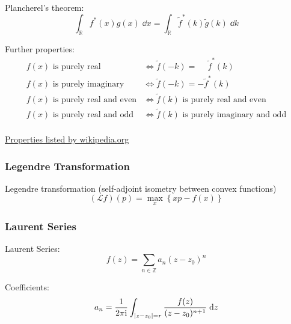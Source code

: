 			\noindent
			Plancherel's theorem:
			\begin{equation}
				\int_{\mathbb{R}} f^{*}(x) g(x)\;\dd x =
				\int_{\mathbb{R}}\tilde{f}^{*}(k)\tilde{g}(k)\;\dd k
			\end{equation}

			\noindent
			Further properties:
			\begin{equation}
				\begin{aligned}
					f(x)\text{ is purely real} &\Leftrightarrow \tilde{f}(-k) = \phantom{-}\tilde{f}^*(k) \\
					f(x)\text{ is purely imaginary} &\Leftrightarrow \tilde{f}(-k) = -\tilde{f}^*(k) \\
					f(x)\text{ is purely real and even} &\Leftrightarrow \tilde{f}(k)\text{ is purely real and even} \\
					f(x)\text{ is purely real and odd} &\Leftrightarrow \tilde{f}(k)\text{ is purely imaginary and odd} \\
				\end{aligned}
			\end{equation}

			\noindent
			\href{https://en.wikipedia.org/wiki/Fourier_transform#Functional_relationships,_one-dimensional}{Properties listed by wikipedia.org}

		\subsubsection{Legendre Transformation}
			\noindent
			Legendre transformation (self-adjoint isometry between convex functions)
			\begin{equation}
				(\mathcal{L}f)(p)=\max_x\left\lbrace xp-f(x) \right\rbrace
			\end{equation}


		\subsubsection{Laurent Series}
			\noindent
			Laurent Series:
			\begin{equation}
				f(z)=\sum_{n\in\mathbb{Z}} a_n(z-z_0)^n
			\end{equation}

			\noindent
			Coefficients:
			\begin{equation}
				a_n = \frac{1}{2 \pi \mathrm{i}}\int_{\abs{ z-z_0 } = r} \frac{f(z)}{(z-z_0)^{n+1}}\;\dd z
			\end{equation}

